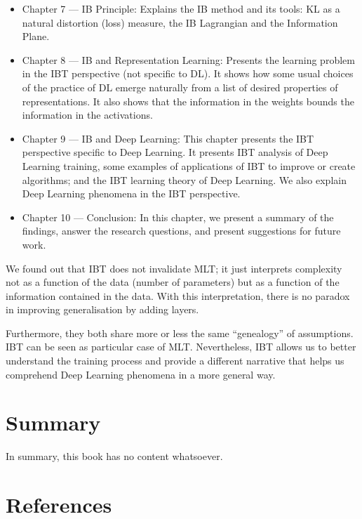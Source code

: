 \documentclass[
  letterpaper,
  a4paper,
  12pt,
  twoside,
  brazil,
  british,
  open=right]{scrbook}
\begin{document}
\begin{enumerate}
  \begin{itemize}
  \item
    Chapter 7 --- IB Principle: Explains the IB method and its tools:
    {KL} as a natural distortion (loss) measure, the IB Lagrangian and
    the Information Plane.
  \item
    Chapter 8 --- IB and Representation Learning: Presents the learning
    problem in the {IBT} perspective (not specific to {DL}). It shows
    how some usual choices of the practice of {DL} emerge naturally from
    a list of desired properties of representations. It also shows that
    the information in the weights bounds the information in the
    activations.
  \item
    Chapter 9 --- IB and Deep Learning: This chapter presents the {IBT}
    perspective specific to Deep Learning. It presents {IBT} analysis of
    Deep Learning training, some examples of applications of {IBT} to
    improve or create algorithms; and the {IBT} learning theory of Deep
    Learning. We also explain Deep Learning phenomena in the {IBT}
    perspective.
  \item
    Chapter 10 --- Conclusion: In this chapter, we present a summary of
    the findings, answer the research questions, and present suggestions
    for future work.
  \end{itemize}
\end{enumerate}

We found out that {IBT} does not invalidate {MLT}; it just interprets
complexity not as a function of the data (number of parameters) but as a
function of the information contained in the data. With this
interpretation, there is no paradox in improving generalisation by
adding layers.

Furthermore, they both share more or less the same ``genealogy'' of
assumptions. {IBT} can be seen as particular case of {MLT}.
Nevertheless, {IBT} allows us to better understand the training process
and provide a different narrative that helps us comprehend Deep Learning
phenomena in a more general way.


\hypertarget{summary}{%
\chapter{Summary}\label{summary}}

In summary, this book has no content whatsoever.


\hypertarget{references}{%
\chapter*{References}\label{references}}




\backmatter
\end{document}
